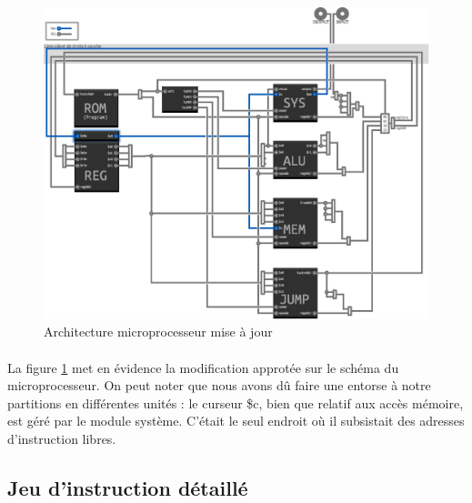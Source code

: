\documentclass{article}
\begin{document}
\begin{figure}[h]
\centering
\includegraphics{archi_update.eps}
\caption{\label{archi_update} Architecture microprocesseur mise à jour}
\end{figure}
\paragraph{}La figure \ref{archi_update} met en évidence la modification approtée sur le schéma du microprocesseur. On peut noter que nous avons dû faire une entorse à notre partitions en différentes unités : le curseur \$c, bien que relatif aux accès mémoire, est géré par le module système. C'était le seul endroit où il subsistait des adresses d'instruction libres.


\subsection{Jeu d'instruction détaillé}
\end{document}
